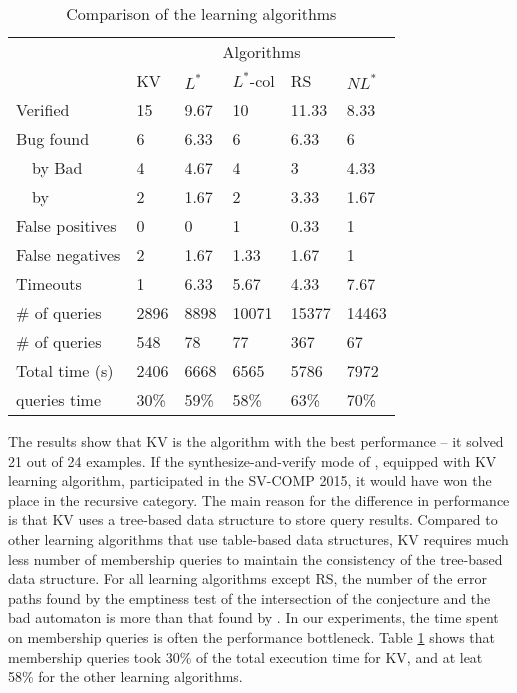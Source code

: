 \begin{table}[h]
	\caption{Comparison of the learning algorithms}
	\label{table:compare_learning_algorithms}
	\centering
	\begin{tabular}{|l|l|l|l|l|l|}
		\cline{2-6}
		\multicolumn{1}{c|}{} & \multicolumn{5}{c|}{Algorithms} \\
		\cline{2-6}
		\multicolumn{1}{c|}{} & KV & $L^\ast$	& $L^\ast$-col & RS & $NL^\ast$ \\
		\hline
		Verified		&  15  & 9.67 &  10  & 11.33& 8.33 \\
		Bug found		&   6  & 6.33 &   6  & 6.33 &    6 \\
		\ \ by Bad  	&   4  & 4.67 &   4  &   3  & 4.33 \\
		\ \ by \CREST	&   2  & 1.67 &   2  & 3.33 & 1.67 \\
		\hline
		False positives	&   0  &   0  &   1  & 0.33 &    1 \\
		False negatives	&   2  & 1.67 & 1.33 & 1.67 &    1 \\
		Timeouts 		&   1  & 6.33 & 5.67 & 4.33 & 7.67 \\
		\hline
		\# of \Mem queries & 2896 & 8898 & 10071 & 15377 & 14463 \\
		\# of \Equ queries & 548 & 78 & 77 & 367 & 67 \\
		\hline
		Total time (s) & 2406 & 6668 & 6565 & 5786 & 7972 \\
		\Mem queries time & 30\% & 59\% & 58\% & 63\% & 70\% \\ 
		\hline
	\end{tabular}
\end{table}

The results show that KV is the algorithm with the best performance -- it solved 21 out of 24 examples. If the synthesize-and-verify mode of \PACMAN, equipped with KV learning algorithm, participated in the SV-COMP 2015, it would have won the  place in the recursive category. The main reason for the difference in performance is that KV uses a tree-based data structure to store query results. Compared to other learning algorithms that use table-based data structures, KV requires much less number of membership queries to maintain the consistency of the tree-based data structure. For all learning algorithms except RS, the number of the error paths found by the emptiness test of the intersection of the conjecture and the bad automaton is more than that found by \CREST. In our experiments, the time spent on membership queries is often the performance bottleneck. Table \ref{table:compare_learning_algorithms} shows that membership queries took 30\% of the total execution time for KV, and at leat 58\% for the other learning algorithms. 

